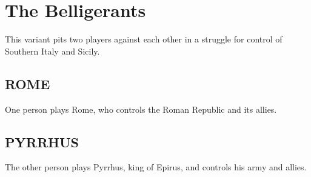 \section{The Belligerants}

This variant pits two players against each other in a struggle for control of Southern Italy and Sicily.

\subsection{ROME}
One person plays Rome, who controls the Roman Republic and its allies.

\subsection{PYRRHUS}
The other person plays Pyrrhus, king of Epirus, and controls his army and allies.